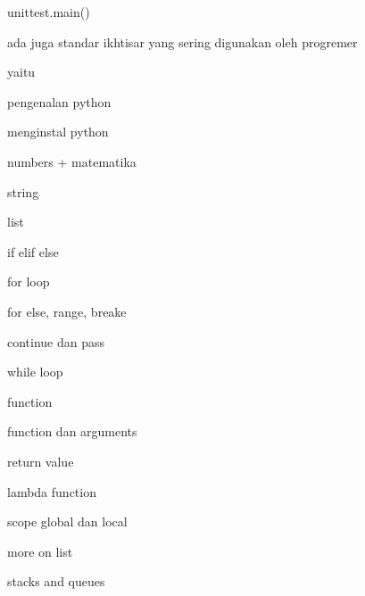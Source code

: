 \noindent 
unittest.main()  \par
\noindent 
ada juga standar ikhtisar yang sering digunakan oleh progremer  \par
\noindent 
yaitu \par
\noindent 
pengenalan python \par
\noindent 
menginstal python \par
\noindent 
numbers + matematika \par
\noindent 
string \par
\noindent 
list  \par
\noindent 
if elif else \par
\noindent 
for loop \par
\noindent 
for else, range, breake \par
\noindent 
continue dan pass \par
\noindent 
while loop \par
\vspace{12pt}
\noindent 
function \par
\noindent 
function dan arguments \par
\noindent 
return value \par
\noindent 
lambda function \par
\noindent 
scope global dan local \par
\noindent 
more on list \par
\noindent 
stacks and queues \par
\vspace{12pt}
\vspace{12pt}
\vspace{12pt}
